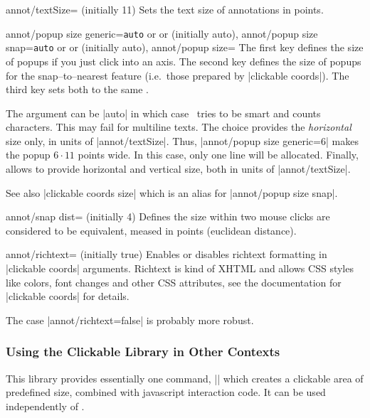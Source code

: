 \begin{pgfplotskey}{annot/textSize= (initially 11)}
	Sets the text size of annotations in points.
\end{pgfplotskey}

\begin{pgfplotskeylist}{%
	annot/popup size generic=\texttt{auto} or  or  (initially auto),%
	annot/popup size snap=\texttt{auto} or  or  (initially auto),%
	annot/popup size=}%
	The first key defines the size of popups if you just click into an axis. The second key defines the size of popups for the snap--to--nearest feature (i.e.\ those prepared by |clickable coords|). The third key sets both to the same .

	The argument can be |auto| in which case \PGFPlots\ tries to be smart and counts characters. This may fail for multiline texts. The choice  provides the \emph{horizontal} size only, in units of |annot/textSize|. Thus, |annot/popup size generic=6| makes the popup $6\cdot 11$ points wide. In this case, only one line will be allocated. Finally,  allows to provide horizontal and vertical size, both in units of |annot/textSize|.

	See also |clickable coords size| which is an alias for |annot/popup size snap|.
\end{pgfplotskeylist}


\begin{pgfplotskey}{annot/snap dist= (initially 4)}
	Defines the size within two mouse clicks are considered to be equivalent, meased in points (euclidean distance).
\end{pgfplotskey}

\begin{pgfplotskey}{annot/richtext= (initially true)}
	Enables or disables richtext formatting in |clickable coords| arguments. Richtext is kind of XHTML and allows CSS styles like colors, font changes and other CSS attributes, see the documentation for |clickable coords| for details.

	The case |annot/richtext=false| is probably more robust.
\end{pgfplotskey}

\subsubsection{Using the Clickable Library in Other Contexts}
This library provides essentially one command, |\pgfplotsclickablecreate| which creates a clickable area of predefined size, combined with javascript interaction code. It can be used independently of \PGFPlots.

